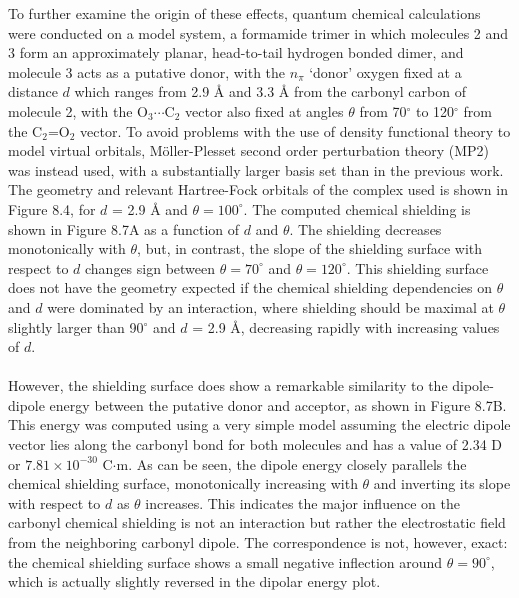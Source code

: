 \begin{doublespace}
To further examine the origin of these effects, quantum chemical calculations
were conducted on a model system, a formamide trimer in which molecules 2 and 3
form an approximately planar, head-to-tail hydrogen bonded dimer, and molecule
3 acts as a putative \npistar{} donor, with the $n_\pi$ `donor' oxygen fixed at
a distance $d$ which ranges from 2.9 \r{A} and 3.3 \r{A} from the carbonyl
carbon of molecule 2, with the O$_3\cdots$C$_2$ vector also fixed at angles
$\theta$ from 70$^\circ$ to 120$^\circ$ from the C$_2$=O$_2$ vector. To avoid
problems with the use of density functional theory to model virtual
orbitals, M\"{o}ller-Plesset second order perturbation theory (MP2) was
instead used, with a substantially larger basis set than in the previous work.
The geometry and relevant Hartree-Fock orbitals of the complex used is shown
in Figure 8.4, for $d$ = 2.9 \r{A} and $\theta = 100^\circ$. The computed
chemical shielding is shown in Figure 8.7A as a function of $d$ and $\theta$.
The shielding decreases monotonically with $\theta$, but, in contrast, the
slope of the shielding surface with respect to $d$ changes sign between
$\theta = 70^\circ$ and $\theta = 120^\circ$. This shielding surface does not
have the geometry expected if the chemical shielding dependencies on $\theta$
and $d$ were dominated by an \npipistar{} interaction, where shielding should
be maximal at $\theta$ slightly larger than 90$^\circ$ and $d$ = 2.9 \r{A},
decreasing rapidly with increasing values of $d$.
\\\\
However, the shielding surface does show a remarkable similarity to the
dipole-dipole energy between the putative donor and acceptor, as shown in
Figure 8.7B. This energy was computed using a very simple model assuming the
electric dipole vector lies along the carbonyl bond for both molecules and has
a value of 2.34 D or $7.81 \times 10^{-30}$ C$\cdot$m. As can be seen, the
dipole energy closely parallels the chemical shielding surface, monotonically
increasing with $\theta$ and inverting its slope with respect to $d$ as
$\theta$ increases. This indicates the major influence on the carbonyl \cnmr{}
chemical shielding is not an \npipistar{} interaction but rather the
electrostatic field from the neighboring carbonyl dipole. The correspondence
is not, however, exact: the chemical shielding surface shows a small negative
inflection around $\theta = 90^\circ$, which is actually slightly reversed in
the dipolar energy plot.
\end{doublespace}

